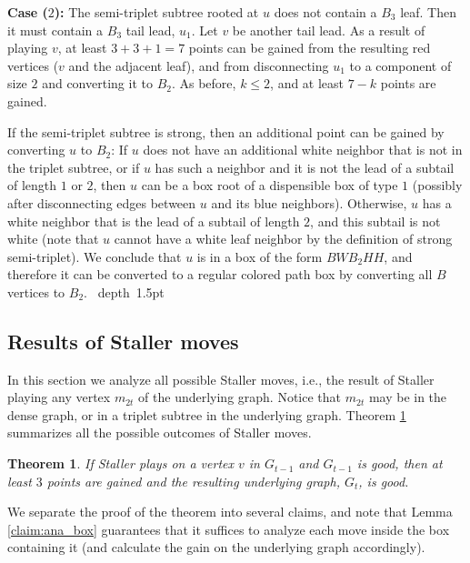 \documentclass[11pt]{article}
\def\blackslug{\hbox{\hskip 1pt \vrule width 4pt height 8pt
    depth 1.5pt \hskip 1pt}}
\def\QED{\quad\blackslug\lower 8.5pt\null\par}
\newtheorem{theorem}{Theorem}[section]
\theoremstyle{definition}
\begin{document}
\smallskip
\par\noindent
{\bf Case ($2$):}
The semi-triplet subtree rooted at $u$ does not contain a $B_3$ leaf.
Then it must contain a $B_3$ tail lead, $u_1$. 
Let $v$ be another tail lead. As a result of playing $v$, at least $3 + 3 + 1 = 7$ points can be gained from the resulting red vertices ($v$ and the adjacent leaf), and from disconnecting $u_1$ to a component of size $2$ and converting it to $B_2$. 
As before, $k \leq 2$, and at least $7 - k$ points are gained.

If the semi-triplet subtree is strong, then an additional point can be gained by converting $u$ to $B_2$:
If $u$ does not have an additional white neighbor that is not in the triplet subtree, 
or if $u$ has such a neighbor and it is not the lead of a subtail of length $1$ or $2$, 
then $u$ can be a box root of a dispensible box of type $1$ (possibly after disconnecting edges between $u$ and its blue neighbors). 
Otherwise, $u$ has a white neighbor that is the lead of a subtail of length $2$, and this subtail is not white (note that $u$ cannot have a white leaf neighbor by the definition of strong semi-triplet). 
We conclude that $u$ is in a box of the form $BWB_2HH$, and therefore it can be converted to a regular colored path box by converting all $B$ vertices to $B_2$.
\QED


\subsection{Results of Staller moves}
\label{sub:an_staller}

In this section we analyze all possible Staller moves, i.e., the result of Staller playing any vertex $m_{2t}$ of the underlying graph.
Notice that $m_{2t}$ may be in the dense graph, or in a triplet subtree in the underlying graph.
Theorem \ref{thm:staller_good} summarizes all the possible outcomes of Staller moves.

\begin{theorem}
\label{thm:staller_good}
If Staller plays on a vertex $v$ in $G_{t-1}$ and $G_{t-1}$ is good, then at least $3$ points are gained and the resulting underlying graph, $G_t$, is good.
\end{theorem}

We separate the proof of the theorem into several claims, and note that Lemma \ref{claim:ana_box} guarantees that it suffices to analyze each move inside the box containing it (and calculate the gain on the underlying graph accordingly).
\end{document}
